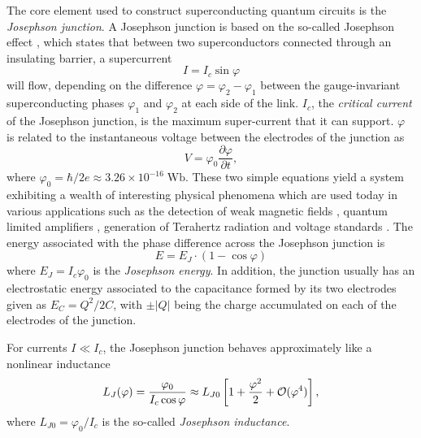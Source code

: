 The core element used to construct superconducting quantum circuits is the {\it Josephson junction}. A Josephson junction is based on the so-called Josephson effect \citep{josephson_possible_1962}, which states that between two superconductors connected through an insulating barrier, a supercurrent
%
\begin{equation}
I = I_c\sin{\varphi}
\end{equation}
%
will flow, depending on the difference $\varphi = \varphi_2-\varphi_1$ between the gauge-invariant superconducting phases $\varphi_1$ and $\varphi_2$ at each side of the link. $I_c$, the {\it critical current} of the Josephson junction, is the maximum super-current that it can support. $\varphi$ is related to the instantaneous voltage between the electrodes of the junction as
%
\begin{equation}
V = \varphi_0\frac{\partial \varphi}{\partial t},
\end{equation}
%
where $\varphi_0 =\hbar/2e \approx 3.26\times 10^{-16}\;\mathrm{Wb}$. These two simple equations yield a system exhibiting a  wealth of interesting physical phenomena which are used today in various applications such as the detection of weak magnetic fields \citep{clarke_squid_2005}, quantum limited amplifiers \citep{vijay_invited_2009}, generation of Terahertz radiation \citep{ozyuzer_emission_2007} and voltage standards \citep{levinsen_inverse_1977}. The energy associated with the phase difference across the Josephson junction is
%
\begin{equation}
E = E_J\cdot(1-\cos{\varphi})
\end{equation}
%
where $E_J = I_c\varphi_0$ is the {\it Josephson energy}. In addition, the junction usually has an electrostatic energy associated to the capacitance formed by its two electrodes given as $E_C = Q^2/2C$, with $\pm|Q|$ being the charge accumulated on each of the electrodes of the junction.

\smallskip

For currents $I\ll I_c$, the Josephson junction behaves approximately like a nonlinear inductance
%
\begin{equation}
L_J(\varphi) = \frac{\varphi_0}{I_c \cos{\varphi}} \approx L_{J0}\left[1+\frac{\varphi^2}{2}+\begin{mathcal}O\end{mathcal}(\varphi^4)\right],\label{eq:josephson_inductance}
\end{equation}
%
where $L_{J0}=\varphi_0/ I_c$ is the so-called {\it Josephson inductance}. 

